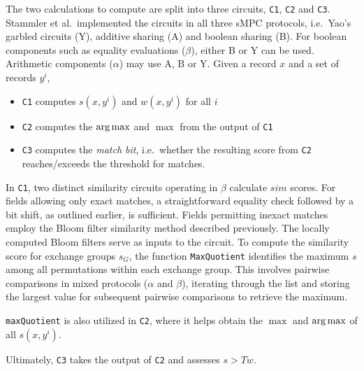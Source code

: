 The two calculations to compute  are split into three circuits, \texttt{C1}, \texttt{C2} and \texttt{C3}.
Stammler et al.\ implemented the circuits in all three sMPC protocols,
i.e.\ Yao's garbled circuits (Y), additive sharing (A) and boolean sharing (B).
For boolean components such as equality evaluations ($\beta$), either B or Y can be used.
Arithmetic components ($\alpha$) may use A, B or Y\@.
Given a record $x$ and a set of records $y^i$,
\begin{itemize}
    \item\texttt{C1} computes $s(x, y^i)$ and $w(x, y^i)$ for all $i$
    \item\texttt{C2} computes the $\operatorname*{arg\,max}$ and $\max$ from the output of \texttt{C1}
    \item\texttt{C3} computes the \textit{match bit}, i.e.\ whether the resulting score from \texttt{C2} reaches/exceeds the threshold for matches.
\end{itemize}
In \texttt{C1}, two distinct similarity circuits operating in $\beta$ calculate $sim$ scores.
For fields allowing only exact matches, a straightforward equality check followed by a bit shift, as outlined earlier, is sufficient.
Fields permitting inexact matches employ the Bloom filter similarity method described previously.
The locally computed Bloom filters serve as inputs to the circuit.
To compute the similarity score for exchange groups $s_G$, the function \texttt{MaxQuotient} identifies the maximum $s$ among all permutations within each exchange group.
This involves pairwise comparisons in mixed protocols ($\alpha$ and $\beta$), iterating through the list and storing the largest value for subsequent pairwise comparisons to retrieve the maximum.

\texttt{maxQuotient} is also utilized in \texttt{C2}, where it helps obtain the $\max$ and $\operatorname*{arg\,max}$ of all $s(x, y^i)$.

Ultimately, \texttt{C3} takes the output of \texttt{C2} and assesses $s>Tw$.

